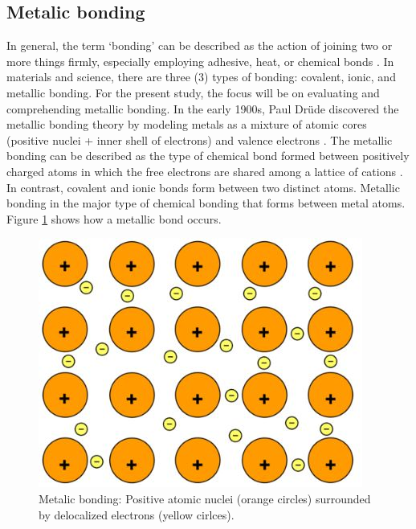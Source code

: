 \documentclass[12pt]{report}
\begin{document}
\subsection{Metalic bonding}
In general, the term ‘bonding’ can be described as the action of joining two or more things firmly, especially employing adhesive, heat, or chemical bonds \cite{soler2000metallic}. In materials and science, there are three (3) types of bonding: covalent, ionic, and metallic bonding. For the present study, the focus will be on evaluating and comprehending metallic bonding.
In the early 1900s, Paul Drüde discovered the metallic bonding theory by modeling metals as a mixture of atomic cores (positive nuclei + inner shell of electrons) and valence electrons \cite{sinex2017general}. The metallic bonding can be described as the type of chemical bond formed between positively charged atoms in which the free electrons are shared among a lattice of cations \cite{lepetit2017topological}. In contrast, covalent and ionic bonds form between two distinct atoms. Metallic bonding in the major type of chemical bonding that forms between metal atoms. Figure \ref{ch3:figure:bonding} shows how a metallic bond occurs.

\begin{figure}[H]
    \centering
    \includegraphics[width=.5\textwidth]{metalic_bonding.jpg}
    \caption{Metalic bonding: Positive atomic nuclei (orange circles) surrounded by delocalized electrons (yellow cirlces)\cite{soler2000metallic}.}
    \label{ch3:figure:bonding}
\end{figure}
\end{document}
